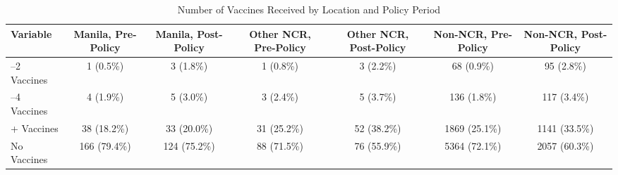 \begin{table}[!h]
\centering
\caption{Number of Vaccines Received by Location and Policy Period}
\centering
\fontsize{8}{10}\selectfont
\begin{tabular}[t]{>{\raggedright\arraybackslash}m{3cm}cccccc}
\toprule
Variable & Manila, Pre-Policy & Manila, Post-Policy & Other NCR, Pre-Policy & Other NCR, Post-Policy & Non-NCR, Pre-Policy & Non-NCR, Post-Policy\\
\midrule
1–2 Vaccines & 1 (0.5\%) & 3 (1.8\%) & 1 (0.8\%) & 3 (2.2\%) & 68 (0.9\%) & 95 (2.8\%)\\
3–4 Vaccines & 4 (1.9\%) & 5 (3.0\%) & 3 (2.4\%) & 5 (3.7\%) & 136 (1.8\%) & 117 (3.4\%)\\
5+ Vaccines & 38 (18.2\%) & 33 (20.0\%) & 31 (25.2\%) & 52 (38.2\%) & 1869 (25.1\%) & 1141 (33.5\%)\\
No Vaccines & 166 (79.4\%) & 124 (75.2\%) & 88 (71.5\%) & 76 (55.9\%) & 5364 (72.1\%) & 2057 (60.3\%)\\
\bottomrule
\end{tabular}
\end{table}
